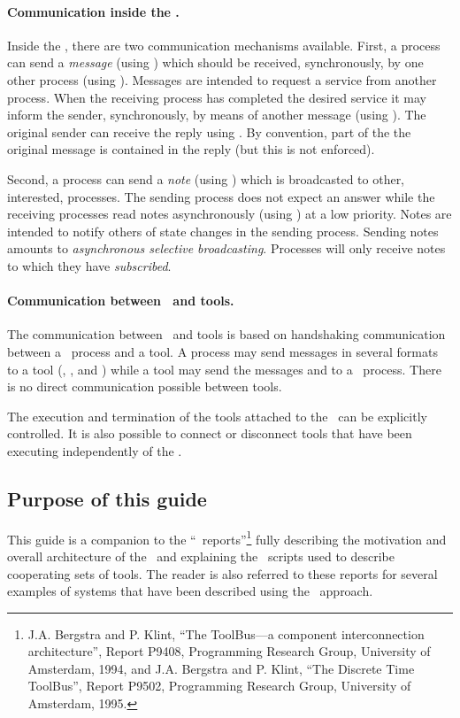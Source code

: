 \documentclass[a4,twoside,noweb]{article} %
\begin{document}
\paragraph{Communication inside the \TB.}
Inside the \TB, there are two communication mechanisms available.
First, a process can send a {\em message} (using ) which
should be received, synchronously, by one other process (using
). Messages are intended to request a service from another
process. When the receiving process has completed the desired service
it may inform the sender, synchronously, by means of another message (using
). The original sender can receive the reply using
.  By convention, part of the the original message is contained
in the reply (but this is not enforced).

Second, a process can send a {\em note} (using ) which is
broadcasted to other, interested, processes. The sending process does
not expect an answer while the receiving processes read notes
asynchronously (using ) at a low priority. Notes are
intended to notify others of state changes in the sending process.
Sending notes amounts to {\em asynchronous selective broadcasting}.
Processes will only receive notes to which they have {\em subscribed}.

\paragraph{Communication between \TB\ and tools.}
The communication between \TB\ and tools is based on handshaking
communication between a \TB\ process and a tool.  A process may send
messages in several formats to a tool (, ,
and ) while a tool may send the messages 
and  to a \TB\ process.  There is no direct communication
possible between tools.

The execution and termination of the tools attached to the \TB\ can be
explicitly controlled. It is also possible to connect or disconnect
tools that have been executing independently of the \TB.

\subsection{Purpose of this guide}
This guide is a companion to the ``\TB\ reports''\footnote{ J.A. Bergstra and
P. Klint, ``The ToolBus---a component interconnection architecture'',
Report P9408, Programming Research Group, University of Amsterdam,
1994, and J.A. Bergstra and P. Klint, ``The Discrete Time ToolBus'',
Report P9502, Programming Research Group, University of Amsterdam, 1995.}
fully describing the motivation and overall architecture of the
\TB\ and explaining the \T\ scripts used to describe cooperating sets
of tools. The reader is also referred to these reports for several examples
of systems that have been described using the \TB\ approach.
\end{document}
